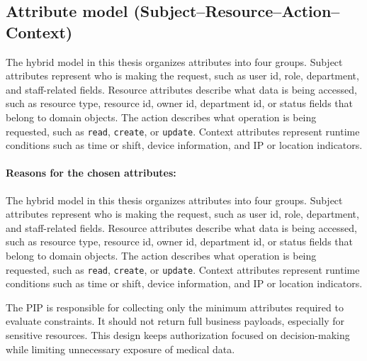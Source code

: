 \subsection{Attribute model (Subject–Resource–Action–Context)}
\label{sec:hybrid-access-control-design}
The hybrid model in this thesis organizes attributes into four groups. Subject attributes represent who is making the request, such as user id, role, department, and staff-related fields. Resource attributes describe what data is being accessed, such as resource type, resource id, owner id, department id, or status fields that belong to domain objects. The action describes what operation is being requested, such as \texttt{read}, \texttt{create}, or \texttt{update}. Context attributes represent runtime conditions such as time or shift, device information, and IP or location indicators.
\vspace{0.5cm}

\paragraph{Reasons for the chosen attributes:}
The hybrid model in this thesis organizes attributes into four groups. Subject attributes represent who is making the request, such as user id, role, department, and staff-related fields. Resource attributes describe what data is being accessed, such as resource type, resource id, owner id, department id, or status fields that belong to domain objects. The action describes what operation is being requested, such as \texttt{read}, \texttt{create}, or \texttt{update}. Context attributes represent runtime conditions such as time or shift, device information, and IP or location indicators.
\vspace{0.5cm}


The PIP is responsible for collecting only the minimum attributes required to evaluate constraints. It should not return full business payloads, especially for sensitive resources. This design keeps authorization focused on decision-making while limiting unnecessary exposure of medical data.





